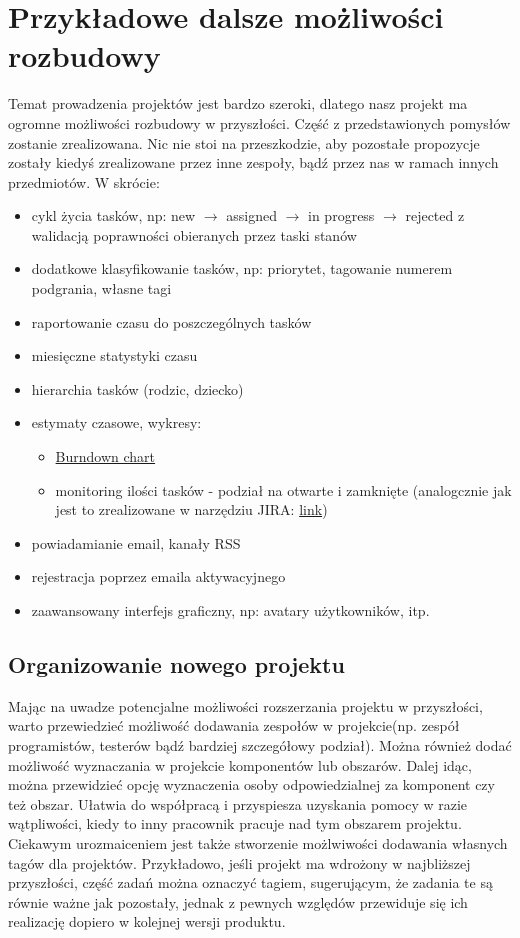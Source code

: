 \documentclass[a4paper,12pt,notitlepage]{mwrep}
\begin{document}
\section{Przykładowe dalsze możliwości rozbudowy}
Temat prowadzenia projektów jest bardzo szeroki, dlatego nasz projekt ma ogromne możliwości
rozbudowy w przyszłości. Część z przedstawionych pomysłów zostanie zrealizowana.
Nic nie stoi na przeszkodzie, aby pozostałe propozycje zostały kiedyś zrealizowane przez
inne zespoły, bądź przez nas w ramach innych przedmiotów. W skrócie:
\begin{itemize}
	\item	cykl życia tasków, np: new $\rightarrow$ assigned $\rightarrow$ in progress $\rightarrow$ rejected
			z walidacją poprawności obieranych przez taski stanów
	\item	dodatkowe klasyfikowanie tasków, np: priorytet, tagowanie numerem podgrania, własne tagi
	\item	raportowanie czasu do poszczególnych tasków
	\item	miesięczne statystyki czasu
	\item	hierarchia tasków (rodzic, dziecko)
	\item	estymaty czasowe, wykresy:
			\begin{itemize}
				\item	\href{http://www.youtube.com/watch?v=XU0llRltyFM&t=4m29s}{Burndown chart}
				\item	monitoring ilości tasków - podział na otwarte i zamknięte (analogcznie jak jest to zrealizowane w narzędziu JIRA:
						\href{https://confluence.atlassian.com/download/attachments/185729486/gadgets-charting-created-vs-resolved.png?version=2&modificationDate=1350347163816&api=v2}{link})
			\end{itemize}
	\item	powiadamianie email, kanały RSS
	\item	rejestracja poprzez emaila aktywacyjnego
	\item	zaawansowany interfejs graficzny, np: avatary użytkowników, itp.
\end{itemize}


\subsection{Organizowanie nowego projektu}
Mając na uwadze potencjalne możliwości rozszerzania projektu w przyszłości,
warto przewiedzieć możliwość dodawania zespołów w projekcie(np. zespół programistów,
testerów bądź bardziej szczegółowy podział). Można również dodać możliwość wyznaczania
w projekcie komponentów lub obszarów. Dalej idąc, można przewidzieć opcję wyznaczenia osoby
odpowiedzialnej za komponent czy też obszar. Ułatwia do współpracą i przyspiesza uzyskania
pomocy w razie wątpliwości, kiedy to inny pracownik pracuje nad tym obszarem projektu.
Ciekawym urozmaiceniem jest także stworzenie możlwiwości dodawania własnych tagów dla projektów.
Przykładowo, jeśli projekt ma wdrożony w najbliższej przyszłości, część zadań można oznaczyć tagiem,
sugerującym, że zadania te są równie ważne jak pozostały, jednak z pewnych względów przewiduje się ich
realizację dopiero w kolejnej wersji produktu.
\end{document}
